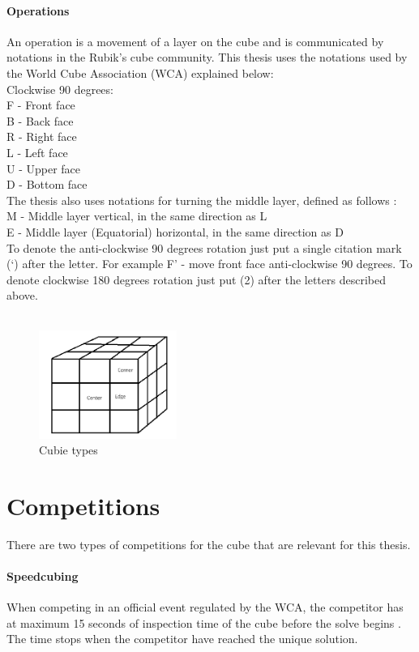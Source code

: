 \documentclass[a4paper,11pt]{kth-mag}
\begin{document}
\paragraph{Operations}
An operation is a movement of a layer on the cube and is communicated by notations in the Rubik's cube community. This thesis uses the notations used by the World Cube Association (WCA) \cite{WCA1} explained below:\\
Clockwise 90 degrees:\\
F - Front face\\
B - Back face\\
R - Right face\\
L - Left face\\
U - Upper face\\
D - Bottom face\\
The thesis also uses notations for turning the middle layer, defined as follows \cite{Ruwix}:\\
M - Middle layer vertical, in the same direction as L\\
E - Middle layer (Equatorial) horizontal, in the same direction as D\\
To denote the anti-clockwise 90 degrees rotation just put a single citation mark (‘) after the letter. For example F’ - move front face anti-clockwise 90 degrees.
To denote clockwise 180 degrees rotation just put (2) after the letters described above.\\\\


\begin{figure}[t]
	\centering
	\includegraphics[width= 0.4\textwidth]{figs/representation.png}
	\caption{Cubie types}
	\label{fig_3}
\end{figure}
\section{Competitions}
There are two types of competitions for the cube that are relevant for this thesis.
\paragraph{Speedcubing}
When competing in an official event regulated by the WCA, the competitor has at maximum 15 seconds of inspection time of the cube before the solve begins \cite{WCA2}. The time stops when the competitor have reached the unique solution. 
\end{document}

